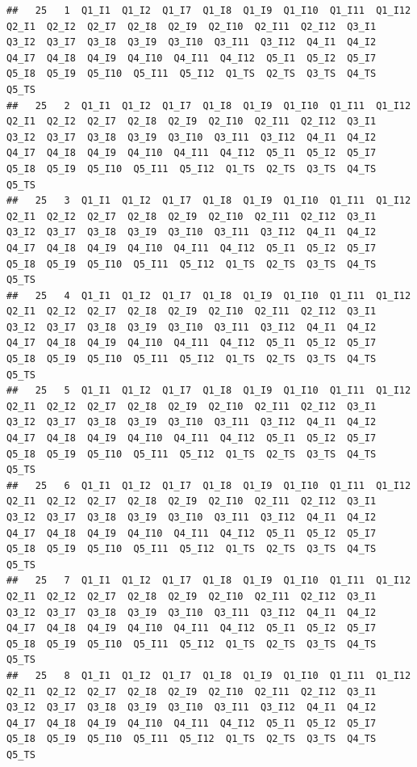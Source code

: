 \documentclass[
]{book}
\begin{document}
\begin{verbatim}
##   25   1  Q1_I1  Q1_I2  Q1_I7  Q1_I8  Q1_I9  Q1_I10  Q1_I11  Q1_I12  Q2_I1  Q2_I2  Q2_I7  Q2_I8  Q2_I9  Q2_I10  Q2_I11  Q2_I12  Q3_I1  Q3_I2  Q3_I7  Q3_I8  Q3_I9  Q3_I10  Q3_I11  Q3_I12  Q4_I1  Q4_I2  Q4_I7  Q4_I8  Q4_I9  Q4_I10  Q4_I11  Q4_I12  Q5_I1  Q5_I2  Q5_I7  Q5_I8  Q5_I9  Q5_I10  Q5_I11  Q5_I12  Q1_TS  Q2_TS  Q3_TS  Q4_TS  Q5_TS
##   25   2  Q1_I1  Q1_I2  Q1_I7  Q1_I8  Q1_I9  Q1_I10  Q1_I11  Q1_I12  Q2_I1  Q2_I2  Q2_I7  Q2_I8  Q2_I9  Q2_I10  Q2_I11  Q2_I12  Q3_I1  Q3_I2  Q3_I7  Q3_I8  Q3_I9  Q3_I10  Q3_I11  Q3_I12  Q4_I1  Q4_I2  Q4_I7  Q4_I8  Q4_I9  Q4_I10  Q4_I11  Q4_I12  Q5_I1  Q5_I2  Q5_I7  Q5_I8  Q5_I9  Q5_I10  Q5_I11  Q5_I12  Q1_TS  Q2_TS  Q3_TS  Q4_TS  Q5_TS
##   25   3  Q1_I1  Q1_I2  Q1_I7  Q1_I8  Q1_I9  Q1_I10  Q1_I11  Q1_I12  Q2_I1  Q2_I2  Q2_I7  Q2_I8  Q2_I9  Q2_I10  Q2_I11  Q2_I12  Q3_I1  Q3_I2  Q3_I7  Q3_I8  Q3_I9  Q3_I10  Q3_I11  Q3_I12  Q4_I1  Q4_I2  Q4_I7  Q4_I8  Q4_I9  Q4_I10  Q4_I11  Q4_I12  Q5_I1  Q5_I2  Q5_I7  Q5_I8  Q5_I9  Q5_I10  Q5_I11  Q5_I12  Q1_TS  Q2_TS  Q3_TS  Q4_TS  Q5_TS
##   25   4  Q1_I1  Q1_I2  Q1_I7  Q1_I8  Q1_I9  Q1_I10  Q1_I11  Q1_I12  Q2_I1  Q2_I2  Q2_I7  Q2_I8  Q2_I9  Q2_I10  Q2_I11  Q2_I12  Q3_I1  Q3_I2  Q3_I7  Q3_I8  Q3_I9  Q3_I10  Q3_I11  Q3_I12  Q4_I1  Q4_I2  Q4_I7  Q4_I8  Q4_I9  Q4_I10  Q4_I11  Q4_I12  Q5_I1  Q5_I2  Q5_I7  Q5_I8  Q5_I9  Q5_I10  Q5_I11  Q5_I12  Q1_TS  Q2_TS  Q3_TS  Q4_TS  Q5_TS
##   25   5  Q1_I1  Q1_I2  Q1_I7  Q1_I8  Q1_I9  Q1_I10  Q1_I11  Q1_I12  Q2_I1  Q2_I2  Q2_I7  Q2_I8  Q2_I9  Q2_I10  Q2_I11  Q2_I12  Q3_I1  Q3_I2  Q3_I7  Q3_I8  Q3_I9  Q3_I10  Q3_I11  Q3_I12  Q4_I1  Q4_I2  Q4_I7  Q4_I8  Q4_I9  Q4_I10  Q4_I11  Q4_I12  Q5_I1  Q5_I2  Q5_I7  Q5_I8  Q5_I9  Q5_I10  Q5_I11  Q5_I12  Q1_TS  Q2_TS  Q3_TS  Q4_TS  Q5_TS
##   25   6  Q1_I1  Q1_I2  Q1_I7  Q1_I8  Q1_I9  Q1_I10  Q1_I11  Q1_I12  Q2_I1  Q2_I2  Q2_I7  Q2_I8  Q2_I9  Q2_I10  Q2_I11  Q2_I12  Q3_I1  Q3_I2  Q3_I7  Q3_I8  Q3_I9  Q3_I10  Q3_I11  Q3_I12  Q4_I1  Q4_I2  Q4_I7  Q4_I8  Q4_I9  Q4_I10  Q4_I11  Q4_I12  Q5_I1  Q5_I2  Q5_I7  Q5_I8  Q5_I9  Q5_I10  Q5_I11  Q5_I12  Q1_TS  Q2_TS  Q3_TS  Q4_TS  Q5_TS
##   25   7  Q1_I1  Q1_I2  Q1_I7  Q1_I8  Q1_I9  Q1_I10  Q1_I11  Q1_I12  Q2_I1  Q2_I2  Q2_I7  Q2_I8  Q2_I9  Q2_I10  Q2_I11  Q2_I12  Q3_I1  Q3_I2  Q3_I7  Q3_I8  Q3_I9  Q3_I10  Q3_I11  Q3_I12  Q4_I1  Q4_I2  Q4_I7  Q4_I8  Q4_I9  Q4_I10  Q4_I11  Q4_I12  Q5_I1  Q5_I2  Q5_I7  Q5_I8  Q5_I9  Q5_I10  Q5_I11  Q5_I12  Q1_TS  Q2_TS  Q3_TS  Q4_TS  Q5_TS
##   25   8  Q1_I1  Q1_I2  Q1_I7  Q1_I8  Q1_I9  Q1_I10  Q1_I11  Q1_I12  Q2_I1  Q2_I2  Q2_I7  Q2_I8  Q2_I9  Q2_I10  Q2_I11  Q2_I12  Q3_I1  Q3_I2  Q3_I7  Q3_I8  Q3_I9  Q3_I10  Q3_I11  Q3_I12  Q4_I1  Q4_I2  Q4_I7  Q4_I8  Q4_I9  Q4_I10  Q4_I11  Q4_I12  Q5_I1  Q5_I2  Q5_I7  Q5_I8  Q5_I9  Q5_I10  Q5_I11  Q5_I12  Q1_TS  Q2_TS  Q3_TS  Q4_TS  Q5_TS

\end{verbatim}
\end{document}
